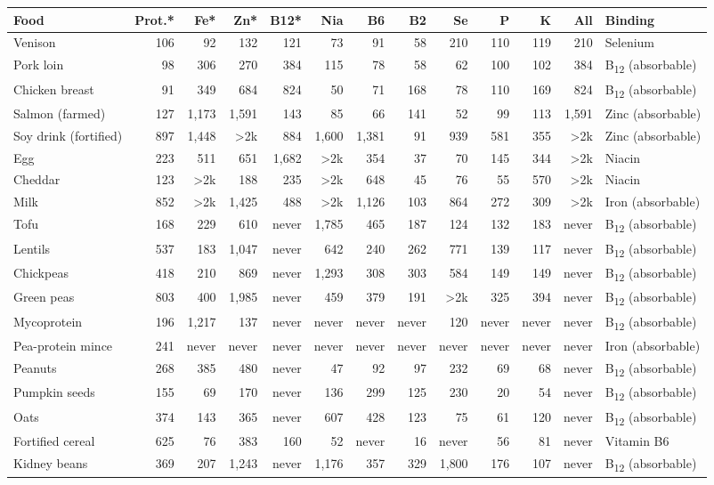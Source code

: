 \begin{tabular}{lrrrrrrrrrrrl}
\toprule
Food & Prot.* & Fe* & Zn* & B12* & Nia & B6 & B2 & Se & P & K & All & Binding \\
\midrule
Venison & 106 & 92 & 132 & 121 & 73 & 91 & 58 & 210 & 110 & 119 & 210 & Selenium \\
Pork loin & 98 & 306 & 270 & 384 & 115 & 78 & 58 & 62 & 100 & 102 & 384 & B\textsubscript{12} (absorbable) \\
Chicken breast & 91 & 349 & 684 & 824 & 50 & 71 & 168 & 78 & 110 & 169 & 824 & B\textsubscript{12} (absorbable) \\
Salmon (farmed) & 127 & 1{,}173 & 1{,}591 & 143 & 85 & 66 & 141 & 52 & 99 & 113 & 1{,}591 & Zinc (absorbable) \\
Soy drink (fortified) & 897 & 1{,}448 & >2k & 884 & 1{,}600 & 1{,}381 & 91 & 939 & 581 & 355 & >2k & Zinc (absorbable) \\
Egg & 223 & 511 & 651 & 1{,}682 & >2k & 354 & 37 & 70 & 145 & 344 & >2k & Niacin \\
Cheddar & 123 & >2k & 188 & 235 & >2k & 648 & 45 & 76 & 55 & 570 & >2k & Niacin \\
Milk & 852 & >2k & 1{,}425 & 488 & >2k & 1{,}126 & 103 & 864 & 272 & 309 & >2k & Iron (absorbable) \\
Tofu & 168 & 229 & 610 & never & 1{,}785 & 465 & 187 & 124 & 132 & 183 & never & B\textsubscript{12} (absorbable) \\
Lentils & 537 & 183 & 1{,}047 & never & 642 & 240 & 262 & 771 & 139 & 117 & never & B\textsubscript{12} (absorbable) \\
Chickpeas & 418 & 210 & 869 & never & 1{,}293 & 308 & 303 & 584 & 149 & 149 & never & B\textsubscript{12} (absorbable) \\
Green peas & 803 & 400 & 1{,}985 & never & 459 & 379 & 191 & >2k & 325 & 394 & never & B\textsubscript{12} (absorbable) \\
Mycoprotein & 196 & 1{,}217 & 137 & never & never & never & never & 120 & never & never & never & B\textsubscript{12} (absorbable) \\
Pea-protein mince & 241 & never & never & never & never & never & never & never & never & never & never & Iron (absorbable) \\
Peanuts & 268 & 385 & 480 & never & 47 & 92 & 97 & 232 & 69 & 68 & never & B\textsubscript{12} (absorbable) \\
Pumpkin seeds & 155 & 69 & 170 & never & 136 & 299 & 125 & 230 & 20 & 54 & never & B\textsubscript{12} (absorbable) \\
Oats & 374 & 143 & 365 & never & 607 & 428 & 123 & 75 & 61 & 120 & never & B\textsubscript{12} (absorbable) \\
Fortified cereal & 625 & 76 & 383 & 160 & 52 & never & 16 & never & 56 & 81 & never & Vitamin B6 \\
Kidney beans & 369 & 207 & 1{,}243 & never & 1{,}176 & 357 & 329 & 1{,}800 & 176 & 107 & never & B\textsubscript{12} (absorbable) \\
\bottomrule
\end{tabular}
